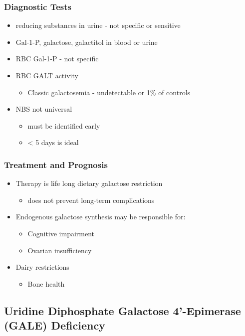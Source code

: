 \documentclass{scrartcl}
\begin{document}
\subsubsection{Diagnostic Tests}
\label{sec:org09b12a5}
\begin{itemize}
\item reducing substances in urine - not specific or sensitive
\item Gal-1-P, galactose, galactitol in blood or urine
\item RBC Gal-1-P - not specific
\item RBC GALT activity
\begin{itemize}
\item Classic galactosemia - undetectable or 1\% of controls
\end{itemize}
\item NBS not universal
\begin{itemize}
\item must be identified early
\item \textless{} 5 days is ideal
\end{itemize}
\end{itemize}

\subsubsection{Treatment and Prognosis}
\label{sec:orgb32cc9f}
\begin{itemize}
\item Therapy is life long dietary galactose restriction
\begin{itemize}
\item does not prevent long-term complications
\end{itemize}

\item Endogenous galactose synthesis may be responsible for:
\begin{itemize}
\item Cognitive impairment
\item Ovarian insufficiency
\end{itemize}
\item Dairy restrictions
\begin{itemize}
\item Bone health
\end{itemize}
\end{itemize}

\subsection{Uridine Diphosphate Galactose 4’-Epimerase (GALE) Deficiency}
\label{sec:orgaf8d1e0}
\end{document}
